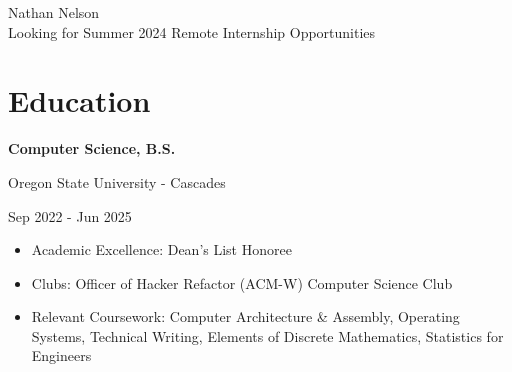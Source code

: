 \documentclass[10pt]{article}
\newcommand{\triline}[3]{%
    \parbox[t][][t]{.4\linewidth}{ #1 }%
    \parbox[t][][t]{.4\linewidth}{ #2 }%
    \parbox[t][][t]{.2\linewidth}{\raggedleft #3 }%
    \vspace{1ex}
}
\newlength{\listpostvertical}
\begin{document}
\titlespacing*{\section}{0pt}{1ex}{2ex}
\titlespacing*{\subsection}{0pt}{1ex}{2ex}

\begin{center}
{ \fontsize{0.6in}{0in}\selectfont Nathan Nelson } \\
\vspace{1ex}
{\large Looking for Summer 2024 Remote Internship Opportunities} \\
\vspace{1ex}
\end{center}

\section{Education}

\triline{\textbf{Computer Science, B.S.}}{Oregon State University - Cascades}{Sep 2022 - Jun 2025}

\begin{itemize}[nosep]
\item Academic Excellence: Dean’s List Honoree
\item Clubs: Officer of Hacker Refactor (ACM-W) Computer Science Club
\item Relevant Coursework: Computer Architecture \& Assembly, Operating Systems, 
    Technical Writing, Elements of Discrete Mathematics, Statistics for Engineers 

\end{itemize}
\vspace{\listpostvertical}
\end{document}
